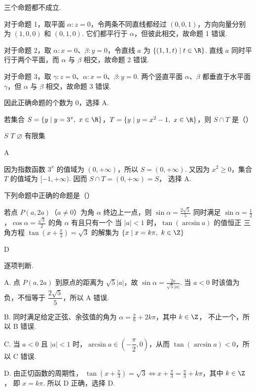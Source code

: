 \begin{solution}
三个命题都不成立.

对于命题 1，取平面 \(\alpha:z=0\)，令两条不同直线都经过 \((0,0,1)\)，方向向量分别为 \((1,0,0)\) 和 \((0,1,0)\). 它们都平行于 \(\alpha\)，但彼此相交，故命题 1 错误.

对于命题 2，取 \(\alpha:x=0\)、\(\beta:y=0\)，令直线 \(a\) 为 \(\{(1,1,t)\mid t\in\R\}\). 直线 \(a\) 同时平行于两个平面，而 \(\alpha\) 与 \(\beta\) 相交，故命题 2 错误.

对于命题 3，取 \(\gamma:z=0\)、\(\alpha:x=0\)、\(\beta:y=0\). 两个竖直平面 \(\alpha\)、\(\beta\) 都垂直于水平面 \(\gamma\)，但 \(\alpha\) 与 \(\beta\) 相交，故命题 3 错误.

因此正确命题的个数为 \(0\)，选择 A.
\end{solution}

\begin{problem}
若集合 \(S=\{y\mid y=3^x,\ x\in\R\}\)，\(T=\{y\mid y=x^2-1,\ x\in\R\}\)，则 \(S\cap T\) 是（\quad）

\choices
    {\(S\)}
    {\(T\)}
    {\(\varnothing\)}
    {有限集}
\end{problem}

\begin{answer}
A
\end{answer}

\begin{solution}
因为指数函数 \(3^x\) 的值域为 \((0,+\infty)\)，所以 \(S=(0,+\infty)\). 又因为 \(x^2\geqslant0\)，集合 \(T\) 的值域为 \([-1,+\infty)\). 因而
\(S\cap T=(0,+\infty)=S\)，
选择 A.
\end{solution}

\begin{problem}
下列命题中正确的命题是（\quad）

\choices
    {若点 \(P(a,2a)\)（\(a\neq 0\)）为角 \(\alpha\) 终边上一点，则 \(\sin\alpha=\frac{2\sqrt{5}}{5}\)}
    {同时满足 \(\sin\alpha=\frac{1}{2}\)，\(\cos\alpha=\frac{\sqrt{3}}{2}\) 的角 \(\alpha\) 有且只有一个}
    {当 \(|a|<1\) 时，\(\tan\left(\arcsin a\right)\) 的值恒正}
    {三角方程 \(\tan\left(x+\frac{\pi}{3}\right)=\sqrt{3}\) 的解集为 \(\{x\mid x=k\pi,\ k\in\Z\}\)}
\end{problem}

\begin{answer}
D
\end{answer}

\begin{solution}
逐项判断.

A. 点 \(P(a,2a)\) 到原点的距离为 \(\sqrt5|a|\)，故
\(\sin\alpha=\frac{2a}{\sqrt5|a|}\).
当 \(a<0\) 时该值为负，不恒等于 \(\dfrac{2\sqrt5}{5}\)，所以 A 错误.

B. 同时满足给定正弦、余弦值的角为
\(\alpha=\frac\pi6+2k\pi\)，其中 \(k\in\Z\)，
不止一个，所以 B 错误.

C. 当 \(a<0\) 且 \(|a|<1\) 时，\(\arcsin a\in\left(-\dfrac\pi2,0\right)\)，从而 \(\tan(\arcsin a)<0\)，所以 C 错误.

D. 由正切函数的周期性，
\(\tan\left(x+\frac\pi3\right)=\sqrt3\Longleftrightarrow x+\frac\pi3=\frac\pi3+k\pi\)，其中 \(k\in\Z\)，
即 \(x=k\pi\). 所以 D 正确，选择 D.
\end{solution}

